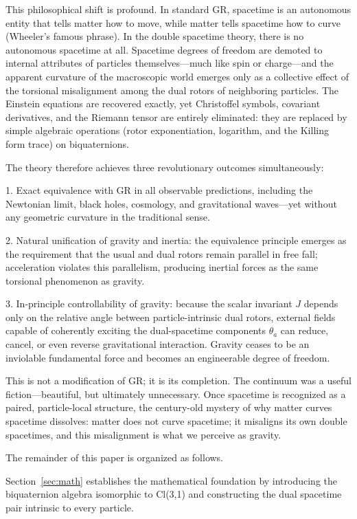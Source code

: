 \documentclass[dvipdfmx,a4paper]{article}
\begin{document}
This philosophical shift is profound. In standard GR, spacetime is an autonomous entity that tells matter how to move, while matter tells spacetime how to curve (Wheeler's famous phrase). In the double spacetime theory, there is no autonomous spacetime at all. Spacetime degrees of freedom are demoted to internal attributes of particles themselves—much like spin or charge—and the apparent curvature of the macroscopic world emerges only as a collective effect of the torsional misalignment among the dual rotors of neighboring particles. The Einstein equations are recovered exactly, yet Christoffel symbols, covariant derivatives, and the Riemann tensor are entirely eliminated: they are replaced by simple algebraic operations (rotor exponentiation, logarithm, and the Killing form trace) on biquaternions.

The theory therefore achieves three revolutionary outcomes simultaneously:

1. Exact equivalence with GR in all observable predictions, including the Newtonian limit, black holes, cosmology, and gravitational waves—yet without any geometric curvature in the traditional sense.

2. Natural unification of gravity and inertia: the equivalence principle emerges as the requirement that the usual and dual rotors remain parallel in free fall; acceleration violates this parallelism, producing inertial forces as the same torsional phenomenon as gravity.

3. In-principle controllability of gravity: because the scalar invariant $J$ depends only on the relative angle between particle-intrinsic dual rotors, external fields capable of coherently exciting the dual-spacetime components $\theta_a$ can reduce, cancel, or even reverse gravitational interaction. Gravity ceases to be an inviolable fundamental force and becomes an engineerable degree of freedom.

This is not a modification of GR; it is its completion. The continuum was a useful fiction—beautiful, but ultimately unnecessary. Once spacetime is recognized as a paired, particle-local structure, the century-old mystery of why matter curves spacetime dissolves: matter does not curve spacetime; it misaligns its own double spacetimes, and this misalignment is what we perceive as gravity.

The remainder of this paper is organized as follows.

Section~\ref{sec:math} establishes the mathematical foundation by introducing the biquaternion algebra isomorphic to Cl(3,1) and constructing the dual spacetime pair intrinsic to every particle.
\end{document}
